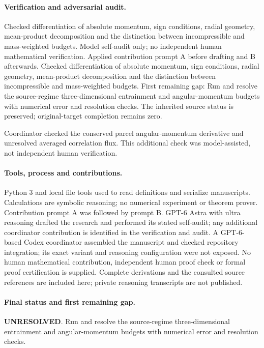 \documentclass[11pt]{article}
\begin{document}
\paragraph{Verification and adversarial audit.}
Checked differentiation of absolute momentum, sign conditions, radial geometry, mean-product decomposition and the distinction between incompressible and mass-weighted budgets. Model self-audit only; no independent human mathematical verification. Applied contribution prompt A before drafting and B afterwards. Checked differentiation of absolute momentum, sign conditions, radial geometry, mean-product decomposition and the distinction between incompressible and mass-weighted budgets. First remaining gap: Run and resolve the source-regime three-dimensional entrainment and angular-momentum budgets with numerical error and resolution checks. The inherited source status is preserved; original-target completion remains zero.

Coordinator checked the conserved parcel angular-momentum derivative and unresolved averaged correlation flux. This additional check was model-assisted, not independent human verification.

\paragraph{Tools, process and contributions.}
Python 3 and local file tools used to read definitions and serialize manuscripts. Calculations are symbolic reasoning; no numerical experiment or theorem prover. Contribution prompt A was followed by prompt B. GPT-6 Astra with ultra reasoning drafted the research and performed its stated self-audit; any additional coordinator contribution is identified in the verification and audit. A GPT-6-based Codex coordinator assembled the manuscript and checked repository integration; its exact variant and reasoning configuration were not exposed. No human mathematical contribution, independent human proof check or formal proof certification is supplied. Complete derivations and the consulted source references are included here; private reasoning transcripts are not published.

\paragraph{Final status and first remaining gap.}
\textbf{UNRESOLVED}. Run and resolve the source-regime three-dimensional entrainment and angular-momentum budgets with numerical error and resolution checks.
\end{document}
